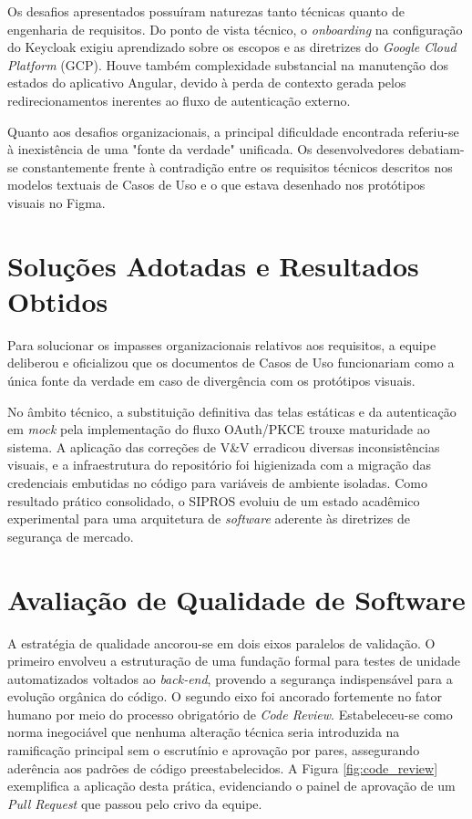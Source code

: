 Os desafios apresentados possuíram naturezas tanto técnicas quanto de engenharia de requisitos. Do ponto de vista técnico, o \textit{onboarding} na configuração do Keycloak exigiu aprendizado sobre os escopos e as diretrizes do \textit{Google Cloud Platform} (GCP). Houve também complexidade substancial na manutenção dos estados do aplicativo Angular, devido à perda de contexto gerada pelos redirecionamentos inerentes ao fluxo de autenticação externo.

Quanto aos desafios organizacionais, a principal dificuldade encontrada referiu-se à inexistência de uma "fonte da verdade" unificada. Os desenvolvedores debatiam-se constantemente frente à contradição entre os requisitos técnicos descritos nos modelos textuais de Casos de Uso e o que estava desenhado nos protótipos visuais no Figma.

\section{Soluções Adotadas e Resultados Obtidos}

Para solucionar os impasses organizacionais relativos aos requisitos, a equipe deliberou e oficializou que os documentos de Casos de Uso funcionariam como a única fonte da verdade em caso de divergência com os protótipos visuais. 

No âmbito técnico, a substituição definitiva das telas estáticas e da autenticação em \textit{mock} pela implementação do fluxo OAuth/PKCE trouxe maturidade ao sistema. A aplicação das correções de V\&V erradicou diversas inconsistências visuais, e a infraestrutura do repositório foi higienizada com a migração das credenciais embutidas no código para variáveis de ambiente isoladas. Como resultado prático consolidado, o SIPROS evoluiu de um estado acadêmico experimental para uma arquitetura de \textit{software} aderente às diretrizes de segurança de mercado.

\section{Avaliação de Qualidade de Software}

A estratégia de qualidade ancorou-se em dois eixos paralelos de validação. O primeiro envolveu a estruturação de uma fundação formal para testes de unidade automatizados voltados ao \textit{back-end}, provendo a segurança indispensável para a evolução orgânica do código. O segundo eixo foi ancorado fortemente no fator humano por meio do processo obrigatório de \textit{Code Review}. Estabeleceu-se como norma inegociável que nenhuma alteração técnica seria introduzida na ramificação principal sem o escrutínio e aprovação por pares, assegurando aderência aos padrões de código preestabelecidos. A Figura \ref{fig:code_review} exemplifica a aplicação desta prática, evidenciando o painel de aprovação de um \textit{Pull Request} que passou pelo crivo da equipe.

